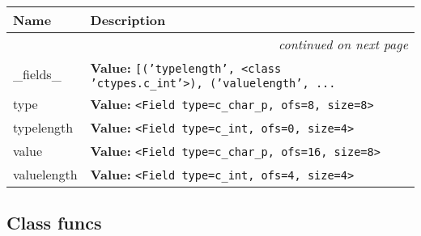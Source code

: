     \vspace{-1cm}
\hspace{\varindent}\begin{longtable}{|p{\varnamewidth}|p{\vardescrwidth}|l}
\cline{1-2}
\cline{1-2} \centering \textbf{Name} & \centering \textbf{Description}& \\
\cline{1-2}
\endhead\cline{1-2}\multicolumn{3}{r}{\small\textit{continued on next page}}\\\endfoot\cline{1-2}
\endlastfoot\raggedright \_\-f\-i\-e\-l\-d\-s\-\_\- & \raggedright \textbf{Value:} 
{\tt \texttt{[}\texttt{(}\texttt{'}\texttt{typelength}\texttt{'}\texttt{, }{\textless}class 'ctypes.c\_int'{\textgreater}\texttt{)}\texttt{, }\texttt{(}\texttt{'}\texttt{valuelength}\texttt{'}\texttt{, }\texttt{...}}&\\
\cline{1-2}
\raggedright t\-y\-p\-e\- & \raggedright \textbf{Value:} 
{\tt {\textless}Field type=c\_char\_p, ofs=8, size=8{\textgreater}}&\\
\cline{1-2}
\raggedright t\-y\-p\-e\-l\-e\-n\-g\-t\-h\- & \raggedright \textbf{Value:} 
{\tt {\textless}Field type=c\_int, ofs=0, size=4{\textgreater}}&\\
\cline{1-2}
\raggedright v\-a\-l\-u\-e\- & \raggedright \textbf{Value:} 
{\tt {\textless}Field type=c\_char\_p, ofs=16, size=8{\textgreater}}&\\
\cline{1-2}
\raggedright v\-a\-l\-u\-e\-l\-e\-n\-g\-t\-h\- & \raggedright \textbf{Value:} 
{\tt {\textless}Field type=c\_int, ofs=4, size=4{\textgreater}}&\\
\cline{1-2}
\end{longtable}



\subsection{Class funcs}

